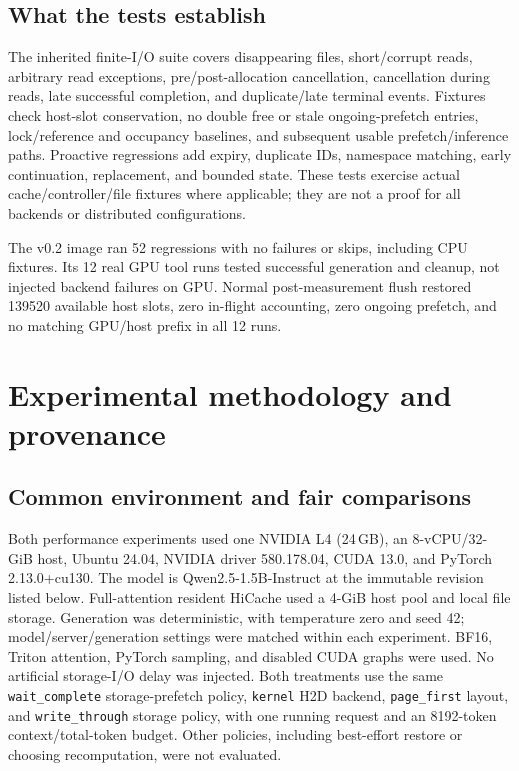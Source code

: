 \documentclass[10pt,a4paper]{article}
\newcommand{\code}[1]{\texttt{#1}}
\newcommand{\pagemark}{\newpage}
\begin{document}
\subsection{What the tests establish}
The inherited finite-I/O suite covers disappearing files, short/corrupt reads, arbitrary read exceptions, pre/post-allocation cancellation, cancellation during reads, late successful completion, and duplicate/late terminal events. Fixtures check host-slot conservation, no double free or stale ongoing-prefetch entries, lock/reference and occupancy baselines, and subsequent usable prefetch/inference paths. Proactive regressions add expiry, duplicate IDs, namespace matching, early continuation, replacement, and bounded state. These tests exercise actual cache/controller/file fixtures where applicable; they are not a proof for all backends or distributed configurations.

The v0.2 image ran 52 regressions with no failures or skips, including CPU fixtures. Its 12 real GPU tool runs tested successful generation and cleanup, not injected backend failures on GPU. Normal post-measurement flush restored 139520 available host slots, zero in-flight accounting, zero ongoing prefetch, and no matching GPU/host prefix in all 12 runs.

\pagemark
\section{Experimental methodology and provenance}
\subsection{Common environment and fair comparisons}
Both performance experiments used one NVIDIA L4 (24\,GB), an 8-vCPU/32-GiB host, Ubuntu 24.04, NVIDIA driver 580.178.04, CUDA 13.0, and PyTorch 2.13.0+cu130. The model is Qwen2.5-1.5B-Instruct at the immutable revision listed below. Full-attention resident HiCache used a 4-GiB host pool and local file storage. Generation was deterministic, with temperature zero and seed 42; model/server/generation settings were matched within each experiment. BF16, Triton attention, PyTorch sampling, and disabled CUDA graphs were used. No artificial storage-I/O delay was injected. Both treatments use the same \code{wait\_complete} storage-prefetch policy, \code{kernel} H2D backend, \code{page\_first} layout, and \code{write\_through} storage policy, with one running request and an 8192-token context/total-token budget. Other policies, including best-effort restore or choosing recomputation, were not evaluated.
\end{document}
